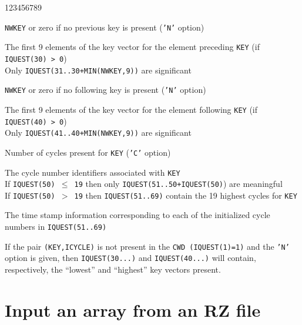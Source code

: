 \begin{DLtt}{123456789}
\item[IQUEST(30)]{\tt NWKEY} or zero if no previous key is present ({\tt'N'} option)
\item[IQUEST(31..39)\ ]The first 9 elements of the key vector for the element preceding {\tt KEY}
(if {\tt IQUEST(30) > 0}) \\
Only {\tt IQUEST(31..30+MIN(NWKEY,9))} are significant\\[3mm]
\item[IQUEST(40)]{\tt NWKEY} or zero if no following key is present ({\tt'N'} option)
\item[IQUEST(41..49)\ ]The first 9 elements of the key vector
for the element following {\tt KEY} (if {\tt IQUEST(40) > 0}) \\
Only {\tt IQUEST(41..40+MIN(NWKEY,9))} are significant \\[3mm]
\item[IQUEST(50)]Number of cycles present for {\tt KEY}
({\tt'C'} option)
\item[IQUEST(51..69)\ ]The cycle number identifiers associated with {\tt KEY}\\
If {\tt IQUEST(50) $\leq$ 19} then only {\tt IQUEST(51..50+IQUEST(50)})
are meaningful\\
If {\tt IQUEST(50) $>$ 19} then {\tt IQUEST(51..69)} contain the 19
highest cycles for {\tt KEY}
\item[IQUEST(71..89)\ ]The time stamp
information corresponding to each of the
initialized cycle numbers in {\tt IQUEST(51..69)}
\end{DLtt}
\par If the pair {\tt (KEY,ICYCLE)} is not present in the
{\tt CWD (IQUEST(1)=1)}
and the {\tt'N'} option is given, then {\tt IQUEST(30...)} and {\tt IQUEST(40...)}
will contain, respectively, the ``lowest'' and ``highest'' key vectors present.

\section{Input an array from an RZ file}

